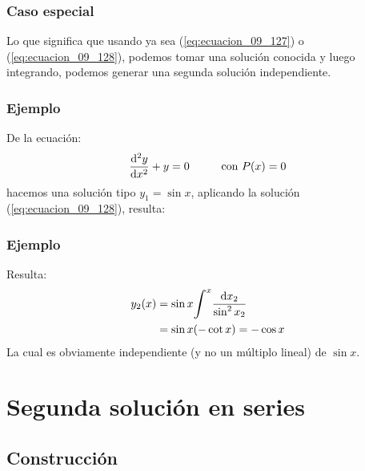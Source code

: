 \documentclass[12pt]{beamer}
\begin{document}
\begin{frame}
\frametitle{Caso especial}
Lo que significa que usando ya sea (\ref{eq:ecuacion_09_127}) o (\ref{eq:ecuacion_09_128}), podemos tomar una solución conocida y luego integrando, podemos generar una segunda solución independiente.
\end{frame}
\begin{frame}
\frametitle{Ejemplo}
De la ecuación:
\pause
\begin{align*}
\dv[2]{y}{x} + y = 0 \hspace{1cm} \mbox{con } P (x) = 0
\end{align*}
hacemos una solución tipo $y_{1} = \sin x$, aplicando la solución (\ref{eq:ecuacion_09_128}), resulta:
\end{frame}
\begin{frame}
\frametitle{Ejemplo}
Resulta:
\begin{align*}
y_{2} (x) &= \sin x \scaleint{6ex}^{x} \dfrac{\dd{x_{2}}}{\sin^{2} x_{2}} \\
&= \sin x (-\cot x) = - \cos x
\end{align*}
La cual es obviamente independiente (y no un múltiplo lineal) de $\sin x$.
\end{frame}

\section{Segunda solución en series}
\subsection{Construcción}
\end{document}
